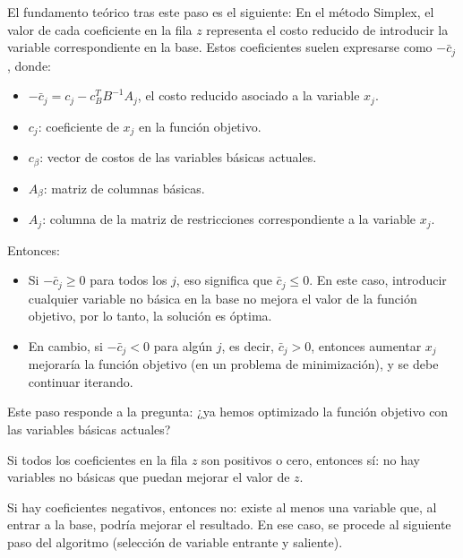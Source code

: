 El fundamento teórico tras este paso es el siguiente: En el método Simplex, el valor de cada coeficiente en la fila \(z\) representa el costo reducido de introducir la variable correspondiente en la base. Estos coeficientes suelen expresarse como \(-\bar{c}_j\), donde:
\begin{itemize}
  \item \(-\bar{c}_j = c_j - c_B^T B^{-1} A_j\), el costo reducido asociado a la variable \(x_j\).
  \item \(c_j\): coeficiente de \(x_j\) en la función objetivo.
  \item \(c_\beta\): vector de costos de las variables básicas actuales.
  \item \(A_\beta\): matriz de columnas básicas.
  \item \(A_j\): columna de la matriz de restricciones correspondiente a la variable \(x_j\).
\end{itemize}
Entonces:
\begin{itemize}
  \item Si \(-\bar{c}_j \geq 0\) para todos los \(j\), eso significa que \(\bar{c}_j \leq 0\). En este caso, introducir cualquier variable no básica en la base no mejora el valor de la función objetivo, por lo tanto, la solución es óptima.
  \item En cambio, si \(-\bar{c}_j < 0\) para algún \(j\), es decir, \(\bar{c}_j > 0\), entonces aumentar \(x_j\) mejoraría la función objetivo (en un problema de minimización), y se debe continuar iterando.
\end{itemize}

Este paso responde a la pregunta: ¿ya hemos optimizado la función objetivo con las variables básicas actuales?

Si todos los coeficientes en la fila \(z\) son positivos o cero, entonces sí: no hay variables no básicas que puedan mejorar el valor de \(z\).

Si hay coeficientes negativos, entonces no: existe al menos una variable que, al entrar a la base, podría mejorar el resultado. En ese caso, se procede al siguiente paso del algoritmo (selección de variable entrante y saliente).

